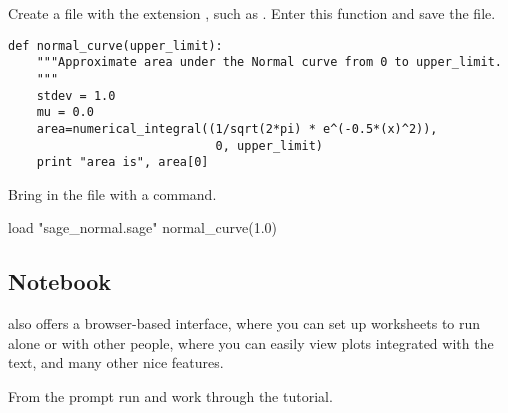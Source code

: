 Create a file with the extension , such as .
Enter this function and save the file.
\begin{lstlisting}[style=python]
def normal_curve(upper_limit):
    """Approximate area under the Normal curve from 0 to upper_limit.
    """
    stdev = 1.0
    mu = 0.0
    area=numerical_integral((1/sqrt(2*pi) * e^(-0.5*(x)^2)),
                             0, upper_limit)    
    print "area is", area[0]
\end{lstlisting}
Bring in the file with a  command.
\begin{sageoutput}
load "sage_normal.sage"
normal_curve(1.0)   
\end{sageoutput}


\subsection{Notebook}
\Sage{} also offers a browser-based interface, where you can set up
worksheets to run alone or with other people, where you can easily
view plots integrated with the text, and many other nice features.

From the \Sage{} prompt run  and
work through the tutorial.
\endinput


TODO:
  1) how to use notebook to do exercises?